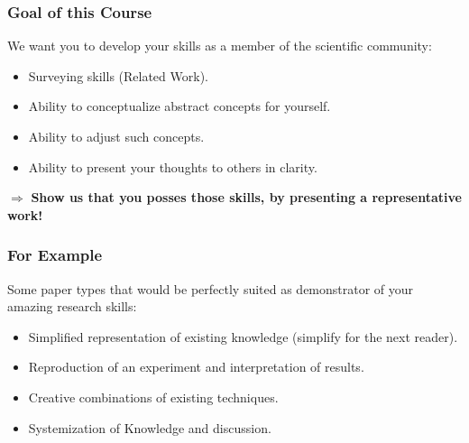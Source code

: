 \documentclass{i20lecture}
\begin{document}
\begin{frame}
	\frametitle{Goal of this Course}

	We want you to develop your skills as a member of the \alert{scientific community}:
	\vspace{0.5cm}
	\begin{itemize}
		\item Surveying skills (Related Work).
		\item Ability to conceptualize abstract concepts for yourself.
		\item Ability to adjust such concepts.
		\item Ability to present your thoughts to others in clarity.
	\end{itemize}

	\vspace{1cm}
	$\Rightarrow$ \textbf{Show us that you posses those skills, by presenting a representative work!}
\end{frame}

\begin{frame}
	\frametitle{For Example}
	Some paper types that would be perfectly suited as demonstrator of your amazing research skills:
	\vspace{0.5cm}
	\begin{itemize}
		\item Simplified representation of existing knowledge (simplify for the next reader).
		\item Reproduction of an experiment and interpretation of results.
		\item Creative combinations of existing techniques.
		\item Systemization of Knowledge and discussion.
	\end{itemize}
	\vspace{1cm}
\end{frame}
\end{document}
